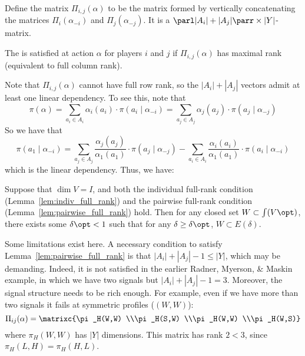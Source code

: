 \documentclass[10pt]{article}
\begin{document}
 Define the matrix $\Pi_{i,j}(\alpha)$ to be the matrix formed by vertically concatenating the matrices $\Pi_i(\alpha_{-i})$ and $\Pi_j(\alpha_{-j})$. It is a $\parl |A_i| + |A_j|\parr \times |Y|$-matrix.
 
 \begin{lemma}\label{lem:pairwise_full_rank}
 	The  is satisfied at action $\alpha$ for players $i$ and $j$ if $\Pi_{i,j}(\alpha)$ has maximal rank (equivalent to full column rank). 
 \end{lemma}
 
 Note that $\Pi_{i,j}(\alpha)$ cannot have full row rank, so the $|A_i| + |A_j|$ vectors admit at least one linear dependency. To see this, note that \[\pi(\alpha) = \sum_{a_i\in A_i}\alpha_i(a_i) \cdot \pi(a_i \mid \alpha_{-i}) = \sum_{a_j\in A_j}\alpha_j(a_j) \cdot \pi(a_j \mid \alpha_{-j})\]So we have that \[\pi(a_1\mid \alpha_{-i}) = \sum_{a_j\in A_j}\frac{\alpha_j(a_j)}{\alpha_1(a_1)} \cdot \pi(a_j \mid \alpha_{-j}) - \sum_{a_i\in A_i}\frac{\alpha_i(a_i)}{\alpha_1(a_1)} \cdot \pi(a_i \mid \alpha_{-i})\]which is the linear dependency. Thus, we have:
 
 \begin{proposition}
 	 Suppose that $\dim V = I$, and both the individual full-rank condition (Lemma~\ref{lem:indiv_full_rank}) and the pairwise full-rank condition (Lemma~\ref{lem:pairwise_full_rank}) hold. Then for any closed set $W \subset \int(V\opt)$, there exists some $\delta\opt < 1$ such that for any $\delta \ge \delta\opt$, $W \subset E(\delta)$.
 \end{proposition}
\begin{remark}
	Some limitations exist here. A necessary condition to satisfy Lemma~\ref{lem:pairwise_full_rank} is that $|A_i| + |A_j| - 1 \le |Y|$, which may be demanding. Indeed, it is not satisfied in the earlier Radner, Myerson, \& Maskin example, in which we have two signals but $|A_i| + |A_j| - 1 = 3$. Moreover, the signal structure needs to be rich enough. For example, even if we have more than two signals it fails at symmetric profiles (\ie $(W,W)$):
	\[
	\Pi_{ij}(\alpha)  = \matrixc{\pi_H(W,W) \\\pi_H(S,W) \\\pi_H(W,W) \\\pi_H(W,S)}
	\]
	where $\pi_H(W,W)$ has $|Y|$ dimensions. This matrix has rank $2 < 3$, since $\pi_H(L,H) = \pi_H(H,L)$. 
\end{remark}
\end{document}
